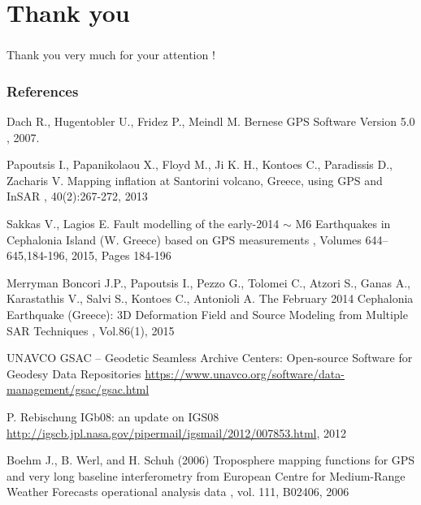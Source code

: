 \documentclass{beamer}
\begin{document}
\section{Thank you}
\begin{frame}\frametitle{}\framesubtitle{}
    \begin{center}
    Thank you very much for your attention !
    \end{center}
\end{frame}

\begin{frame}[allowframebreaks]
  \frametitle<presentation>{References}
  \begin{thebibliography}{10}


  \beamertemplatearticlebibitems

    Dach R., Hugentobler U., Fridez P., Meindl M.
    \newblock Bernese GPS Software Version 5.0
    , 2007.

    Papoutsis I., Papanikolaou X., Floyd M., Ji K. H., Kontoes C., Paradissis D., Zacharis V.
    \newblock Mapping inflation at Santorini volcano, Greece, using GPS and InSAR
    , 40(2):267-272, 2013

    Sakkas V., Lagios E.
    \newblock Fault modelling of the early-2014 $\sim$ M6 Earthquakes in Cephalonia Island (W. Greece) based on GPS measurements
    , Volumes 644–645,184-196, 2015, Pages 184-196

    Merryman Boncori J.P., Papoutsis I., Pezzo G., Tolomei C., Atzori S., Ganas A., Karastathis V., Salvi S., Kontoes C., Antonioli A.
    \newblock The February 2014 Cephalonia Earthquake (Greece): 3D Deformation Field and Source Modeling from Multiple SAR Techniques
    , Vol.86(1), 2015

    UNAVCO
    \newblock GSAC -- Geodetic Seamless Archive Centers: Open-source Software for Geodesy Data Repositories
     \url{https://www.unavco.org/software/data-management/gsac/gsac.html}

    P. Rebischung
    \newblock IGb08: an update on IGS08
     \url{http://igscb.jpl.nasa.gov/pipermail/igsmail/2012/007853.html}, 2012

    Boehm J., B. Werl, and H. Schuh (2006)
    \newblock Troposphere mapping functions for GPS and very long baseline interferometry from European Centre for
    Medium-Range Weather Forecasts operational analysis data
    , vol. 111, B02406, 2006

  \end{thebibliography}
\end{frame}
\end{document}
